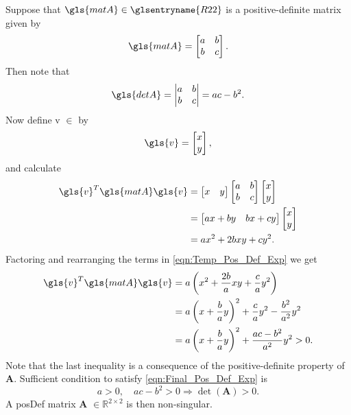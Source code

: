 \begin{example}
Suppose that $\gls{matA} \in \glsentryname{R22}$ is a positive-definite matrix given by
\begin{equation}
	\gls{matA} =
	\begin{bmatrix}
		a & b \\
		b & c	
	\end{bmatrix}.
\end{equation}
Then note that
\begin{equation}
\gls{detA} =
	\begin{vmatrix}
		a & b \\
		b & c	
	\end{vmatrix} = a c - b^{2}.
\end{equation}
Now define \gls{v} $\in$  by
\begin{equation}
	\gls{v} = \begin{bmatrix}	x \\ y	\end{bmatrix},
\end{equation}
and calculate
\begin{equation}	\label{eqn:Temp_Pos_Def_Exp}
	\begin{aligned}
		\gls{v}^T \gls{matA} \gls{v} &=
			\begin{bmatrix} x & y \end{bmatrix}
			\begin{bmatrix} a & b \\ b & c \end{bmatrix}
			\begin{bmatrix} x \\ y \end{bmatrix} \\
		&=	\begin{bmatrix} ax + by & bx + cy \end{bmatrix}
			\begin{bmatrix} x \\ y \end{bmatrix} \\
		&=	ax^{2} + 2bxy + cy^{2}.
	\end{aligned}
\end{equation}
Factoring and rearranging the terms in \cref{eqn:Temp_Pos_Def_Exp} we get
\begin{equation}	\label{eqn:Final_Pos_Def_Exp}
	\begin{aligned}
		\gls{v}^T \gls{matA} \gls{v} &= a \left( x^{2} + \frac{2b}{a} xy + \frac{c}{a} y^{2} \right) \\
		&= a \left( x + \frac{b}{a}y \right)^2 + \frac{c}{a} y^2 - \frac{b^2}{a^2} y^2 \\
		&= a \left( x + \frac{b}{a}y \right)^2 + \frac{ac - b^2}{a^2} y^2 > 0.
	\end{aligned}
\end{equation}
Note that the last inequality is a consequence of the positive-definite property of $\mathbf{A}$. Sufficient
condition to satisfy \cref{eqn:Final_Pos_Def_Exp} is
\begin{equation}
	a > 0, \quad ac - b^2 > 0 \Rightarrow \det(\mathbf{A}) > 0.
\end{equation}
A \gls{posDef} matrix $\mathbf{A}$ $\in \mathbb{R}^{2 \times 2}$ is then non-singular.
\end{example}

